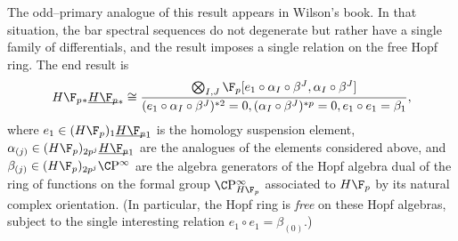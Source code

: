 \begin{remark}
The odd--primary analogue of this result appears in Wilson's book.  In that situation, the bar spectral sequences do not degenerate but rather have a single family of differentials, and the result imposes a single relation on the free Hopf ring.  The end result is \[H\F_p{}_* \OS{H\F_p}{*} \cong \frac{\bigotimes_{I, J} \F_p[e_1 \circ \alpha_I \circ \beta^J, \alpha_I \circ \beta^J]}{(e_1 \circ \alpha_I \circ \beta^J)^{\ast 2} = 0, (\alpha_I \circ \beta^J)^{\ast p} = 0, e_1 \circ e_1 = \beta_1},\] where $e_1 \in (H\F_p)_1 \OS{H\F_p}{1}$ is the homology suspension element, $\alpha_{(j)} \in (H\F_p)_{2p^j} \OS{H\F_p}{1}$ are the analogues of the elements considered above, and $\beta_{(j)} \in (H\F_p)_{2p^j} \CP^\infty$ are the algebra generators of the Hopf algebra dual of the ring of functions on the formal group $\CP^\infty_{H\F_p}$ associated to $H\F_p$ by its natural complex orientation.  (In particular, the Hopf ring is \emph{free} on these Hopf algebras, subject to the single interesting relation $e_1 \circ e_1 = \beta_{(0)}$.) 
\end{remark}






